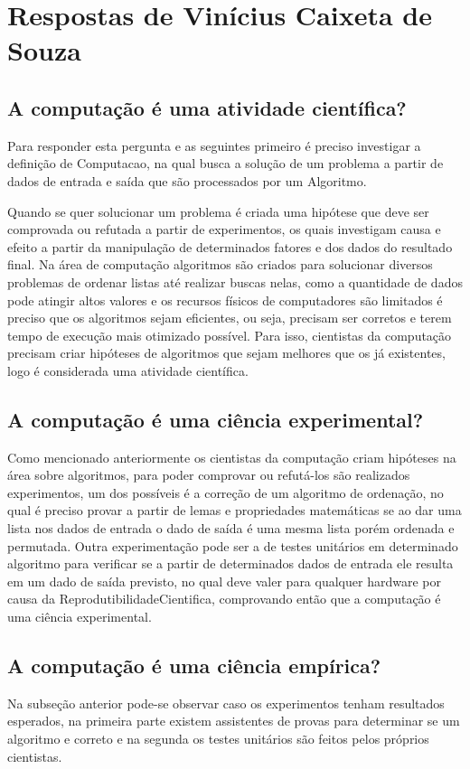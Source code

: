 \section{Respostas de Vinícius Caixeta de Souza}

\subsection{A computação é uma atividade científica?}
Para responder esta pergunta e as seguintes primeiro é preciso investigar a definição de \gls{Computacao}, na qual busca a solução de um problema a partir de dados de entrada e saída que são processados por um \gls{Algoritmo}.

Quando se quer solucionar um problema é criada uma hipótese que deve ser comprovada ou refutada a partir de experimentos, os quais investigam causa e efeito a partir da manipulação de determinados fatores e dos dados do resultado final. Na área de computação algoritmos são criados para solucionar diversos problemas de ordenar listas até realizar buscas nelas, como a quantidade de dados pode atingir altos valores e os recursos físicos de computadores são limitados é preciso que os algoritmos sejam eficientes, ou seja, precisam ser corretos e terem tempo de execução mais otimizado possível. Para isso, cientistas da computação precisam criar hipóteses de algoritmos que sejam melhores que os já existentes, logo é considerada uma atividade científica.

\subsection{A computação é uma ciência experimental?}
Como mencionado anteriormente os cientistas da computação criam hipóteses na área sobre algoritmos, para poder comprovar ou refutá-los são realizados experimentos, um dos possíveis é a correção de um algoritmo de ordenação, no qual é preciso provar a partir de lemas e propriedades matemáticas se ao dar uma lista nos dados de entrada o dado de saída é uma mesma lista porém ordenada e permutada. Outra experimentação pode ser a de testes unitários em determinado algoritmo para verificar se a partir de determinados dados de entrada ele resulta em um dado de saída previsto, no qual deve valer para qualquer hardware por causa da \gls{ReprodutibilidadeCientifica}, comprovando então que a computação é uma ciência experimental.

\subsection{A computação é uma ciência empírica?}
Na subseção anterior pode-se observar caso os experimentos tenham resultados esperados, na primeira parte existem assistentes de provas para determinar se um algoritmo e correto e na segunda os testes unitários são feitos pelos próprios cientistas.